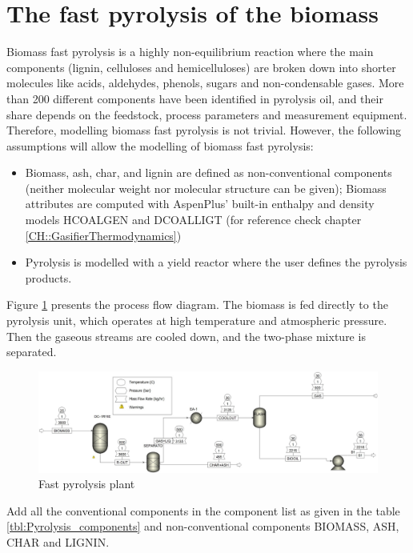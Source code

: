 \newpage
\section{The fast pyrolysis of the biomass}

Biomass fast pyrolysis is a highly non-equilibrium reaction where the main components (lignin, celluloses and hemicelluloses) are broken down into shorter molecules like acids, aldehydes, phenols, sugars and non-condensable gases. More than 200 different components have been identified in pyrolysis oil, and their share depends on the feedstock, process parameters and measurement equipment. Therefore, modelling biomass fast pyrolysis is not trivial. However, the following assumptions will allow the modelling of biomass fast pyrolysis:

\begin{itemize}
	\item Biomass, ash, char, and lignin are defined as non-conventional components (neither molecular weight nor molecular structure can be given); Biomass attributes are computed with AspenPlus’ built-in enthalpy and density models HCOALGEN and DCOALLIGT (for reference check chapter \ref{CH::GasifierThermodynamics})
	\item Pyrolysis is modelled with a yield reactor where the user defines the pyrolysis products.
\end{itemize}

Figure \ref{fig:Pyrolasis} presents the process flow diagram. The biomass is fed directly to the pyrolysis unit, which operates at high temperature and atmospheric pressure. Then the gaseous streams are cooled down, and the two-phase mixture is separated.

\begin{figure}[h!]
	\centering
	\includegraphics[width=\linewidth]{Figures/TchermochemicalProcesses/Pyrolysis.jpeg}
	\caption{Fast pyrolysis plant}
	\label{fig:Pyrolasis}
\end{figure}

Add all the conventional components in the component list as given in the table \ref{tbl:Pyrolysis_components} and non-conventional components BIOMASS, ASH, CHAR and LIGNIN. 

